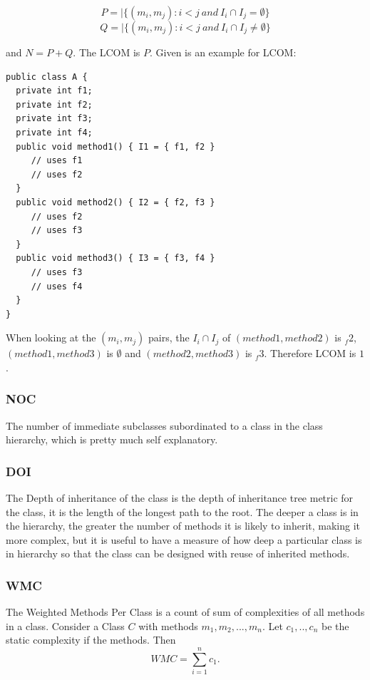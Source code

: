 \begin{displaymath}
	P=|\{(m_i,m_j):i<j \ and \ I_i \cap I_j = \emptyset\}
\end{displaymath}  
\begin{displaymath}
	Q=|\{(m_i,m_j):i<j\ and \ I_i \cap I_j \neq \emptyset\}
\end{displaymath} 

and $N=P+Q$. The LCOM is $P$. Given is an example for LCOM:

\begin{small}
\begin{verbatim}
public class A {
  private int f1;
  private int f2;
  private int f3;
  private int f4;
  public void method1() { I1 = { f1, f2 }
     // uses f1
     // uses f2
  }
  public void method2() { I2 = { f2, f3 }
     // uses f2
     // uses f3
  }
  public void method3() { I3 = { f3, f4 }
     // uses f3
     // uses f4
  }
}
\end{verbatim}
\end{small}

When looking at the $(m_i,m_j)$ pairs, the $I_i \cap I_j$ of $(method1,method2)$ is $_f2$, $(method1,method3)$ is $\emptyset$ and $(method2,method3)$ is $_f3$. Therefore LCOM is $1$.

\subsubsection{\textbf{NOC}} The number of immediate subclasses subordinated to a class in the class hierarchy, which is pretty much self explanatory.

\subsubsection{\textbf{DOI}} The Depth of inheritance of the class is the depth of inheritance tree metric for the class, it is the length of the longest path to the root. The deeper a class is in the hierarchy, the greater the number of methods it is likely to inherit, making it more
complex, but it is useful to have a measure of how deep a particular class is in hierarchy so that the class can be designed with reuse of inherited methods.

\subsubsection{\textbf{WMC}} The Weighted Methods Per Class is a count of sum of complexities of all methods in a class. Consider a Class $C$ with methods $m_1,m_2,...,m_n$. Let $c_1,..,c_n$ be the static complexity if the methods. Then 
\begin{displaymath}
	WMC = \sum_{i=1}^{n} c_1.
\end{displaymath}

